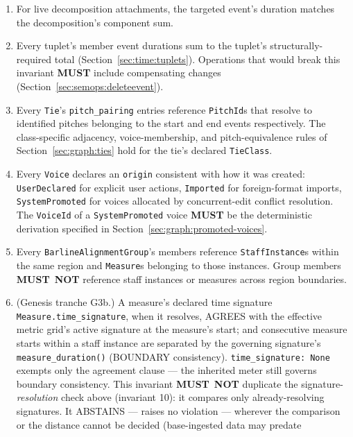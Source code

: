 \documentclass[11pt,letterpaper]{report}
\newcounter{requirement}[chapter]
\newcommand{\MUST}{\textbf{MUST}}
\newcommand{\MUSTNOT}{\textbf{MUST}\nobreak\ \textbf{NOT}}
\begin{document}
\begin{requirement}
\begin{enumerate}
      discipline as for tombstoned pitches.
    \item For live decomposition attachments, the targeted event's
      duration matches the decomposition's component sum.
    \item Every tuplet's member event durations sum to the tuplet's
      structurally-required total
      (Section~\ref{sec:time:tuplets}). Operations that would break
      this invariant \MUST{} include compensating changes
      (Section~\ref{sec:semops:deleteevent}).
    \item Every \texttt{Tie}'s \texttt{pitch\_pairing} entries
      reference \texttt{PitchId}s that resolve to identified pitches
      belonging to the start and end events respectively. The
      class-specific adjacency, voice-membership, and
      pitch-equivalence rules of Section~\ref{sec:graph:ties} hold
      for the tie's declared \texttt{TieClass}.
    \item Every \texttt{Voice} declares an \texttt{origin} consistent
      with how it was created: \texttt{UserDeclared} for explicit
      user actions, \texttt{Imported} for foreign-format imports,
      \texttt{SystemPromoted} for voices allocated by concurrent-edit
      conflict resolution. The \texttt{VoiceId} of a
      \texttt{SystemPromoted} voice \MUST{} be the deterministic
      derivation specified in
      Section~\ref{sec:graph:promoted-voices}.
    \item Every \texttt{BarlineAlignmentGroup}'s members reference
      \texttt{StaffInstance}s within the same region and
      \texttt{Measure}s belonging to those instances. Group members
      \MUSTNOT{} reference staff instances or measures across
      region boundaries.
    \item (Genesis tranche G3b.) A measure's declared time signature
      \texttt{Measure.time\_signature}, when it resolves, AGREES with
      the effective metric grid's active signature at the measure's
      start; and consecutive measure starts within a staff instance
      are separated by the governing signature's
      \texttt{measure\_duration()} (BOUNDARY consistency).
      \texttt{time\_signature: None} exempts only the agreement
      clause --- the inherited meter still governs boundary
      consistency. This invariant \MUSTNOT{} duplicate the
      signature-\emph{resolution} check above (invariant 10): it
      compares only already-resolving signatures. It ABSTAINS ---
      raises no violation --- wherever the comparison or the
      distance cannot be decided (base-ingested data may predate

\end{enumerate}
\end{requirement}
\end{document}
